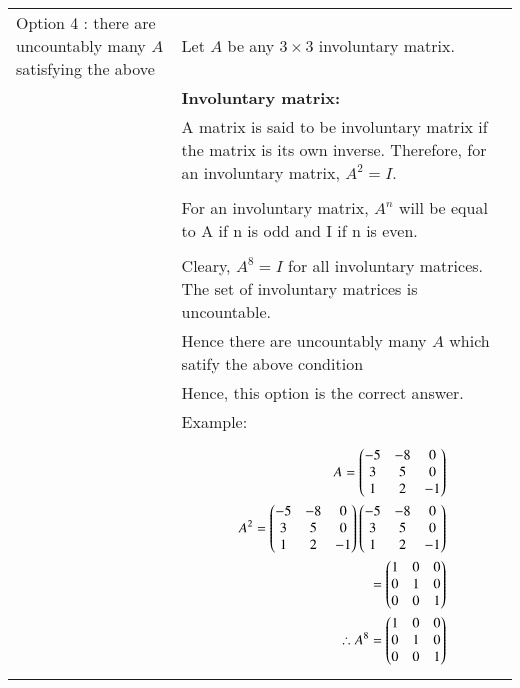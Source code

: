 \begin{table*}[h!]
\begin{center}
\begin{tabular}{ | m{3cm} | m{6cm}| } \hline 
Option 4 :  there are uncountably many  $A$ satisfying the above & Let $A$ be any $3 \times 3$  involuntary matrix. \\&
\textbf{Involuntary matrix: }\\&A matrix is said to be involuntary matrix if the matrix is its own inverse. Therefore, for an involuntary matrix,  $A^2 = I$. \\&\\&
For an involuntary matrix, $A^n$ will be equal to A if n is odd and I if n is even.\\&\\&
Cleary, $A^8 = I$ for all involuntary matrices. The set of involuntary matrices is uncountable.\\&  Hence there are uncountably many $A$ which satify the above condition\\&
Hence, this option is the correct answer.\\&
Example:\\&
{\begin{align*}
A = \begin{pmatrix}-5&-8&0\\3&5&0\\1&2&-1\end{pmatrix}\\
A^2= \begin{pmatrix}-5&-8&0\\3&5&0\\1&2&-1\end{pmatrix}\begin{pmatrix}-5&-8&0\\3&5&0\\1&2&-1\end{pmatrix}\\
= \begin{pmatrix}1&0&0\\0&1&0\\0&0&1\end{pmatrix}\\
\therefore A^8 = \begin{pmatrix}1&0&0\\0&1&0\\0&0&1\end{pmatrix}\\
\end{align*}}
\\  \hline

\end{tabular}
\end{center}
\caption{}
\label{eq:solutions/2018/june/73/tab}
\end{table*}
